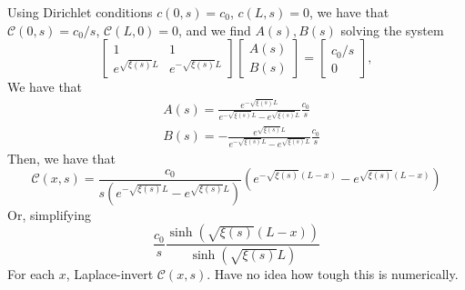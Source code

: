 \documentclass[]{article}
\begin{document}
Using Dirichlet conditions $c(0,s) = c_0$, $c(L,s) = 0$, we have that $\mathcal{C}(0,s) = c_0/s$, $\mathcal{C}(L,0) = 0$, and we find $A(s), B(s)$ solving the system
\begin{equation}
\begin{bmatrix}
1 & 1 \\
e^{\sqrt{\xi(s)} L} & e^{-\sqrt{\xi(s)} L}
\end{bmatrix} \begin{bmatrix} A(s) \\ B(s) \end{bmatrix} = \begin{bmatrix} c_0/s \\ 0 \end{bmatrix},
\end{equation}
We have that
\begin{equation}
\begin{split}
& A(s) = \frac{e^{-\sqrt{\xi(s)} L}}{e^{-\sqrt{\xi(s)} L} - e^{\sqrt{\xi(s)} L}} \frac{c_0}{s} \\
& B(s) = -\frac{e^{\sqrt{\xi(s)} L}}{e^{-\sqrt{\xi(s)} L} - e^{\sqrt{\xi(s)} L}} \frac{c_0}{s}
\end{split}
\end{equation}
Then, we have that
\begin{equation}
\mathcal{C}(x,s) = \frac{c_0}{s \left(e^{-\sqrt{\xi(s)} L} - e^{\sqrt{\xi(s)} L}\right)} \left(e^{-\sqrt{\xi(s)}(L-x)} - e^{\sqrt{\xi(s)}(L-x)}\right)
\end{equation}
Or, simplifying
\begin{equation}
\frac{c_0}{s} \frac{\sinh(\sqrt{\xi(s)}(L-x))}{\sinh(\sqrt{\xi(s)} L)}
\end{equation}
For each $x$, Laplace-invert $\mathcal{C}(x,s)$. Have no idea how tough this is numerically.
\end{document}
